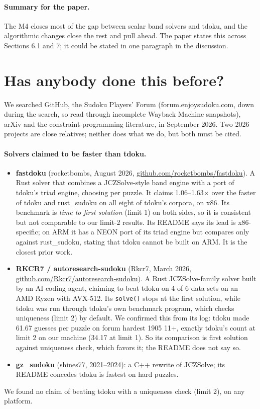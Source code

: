 \documentclass[11pt]{article}
\begin{document}
\paragraph{Summary for the paper.} The M4 closes most of the gap between scalar band solvers and tdoku, and the
algorithmic changes close the rest and pull ahead. The paper states this across Sections 6.1 and 7; it could be
stated in one paragraph in the discussion.


\section*{Has anybody done this before?}

We searched GitHub, the Sudoku Players' Forum (forum.enjoysudoku.com, down during the search, so read through
incomplete Wayback Machine snapshots), arXiv and the constraint-programming literature, in September 2026. Two 2026
projects are close relatives; neither does what we do, but both must be cited.

\paragraph{Solvers claimed to be faster than tdoku.}
\begin{itemize}
\item \textbf{fastdoku} (rocketbombs, August 2026, \url{github.com/rocketbombs/fastdoku}). A Rust solver that combines
  a JCZSolve-style band engine with a port of tdoku's triad engine, choosing per puzzle. It claims 1.06--1.63$\times$
  over the faster of tdoku and rust\_sudoku on all eight of tdoku's corpora, on x86. Its benchmark is \emph{time to
  first solution} (limit 1) on both sides, so it is consistent but not comparable to our limit-2 results. Its README
  says its lead is x86-specific; on ARM it has a NEON port of its triad engine but compares only against rust\_sudoku,
  stating that tdoku cannot be built on ARM. It is the closest prior work.
\item \textbf{RKCR7 / autoresearch-sudoku} (Rkcr7, March 2026,
  \url{github.com/Rkcr7/autoresearch-sudoku}). A Rust
  JCZSolve-family solver built by an AI coding agent, claiming to beat tdoku on 4 of 6 data sets on an AMD Ryzen with
  AVX-512. Its \texttt{solve()} stops at the first solution, while tdoku was run through tdoku's own benchmark program,
  which checks uniqueness (limit 2) by default. We confirmed this from its log: tdoku made 61.67 guesses per puzzle on
  forum hardest 1905 11+, exactly tdoku's count at limit 2 on our machine (34.17 at limit 1). So its comparison is
  first solution against uniqueness check, which favors it; the README does not say so.
\item \textbf{gz\_sudoku} (shines77, 2021--2024): a C++ rewrite of JCZSolve; its README concedes tdoku is fastest on
  hard puzzles.
\end{itemize}
We found no claim of beating tdoku with a uniqueness check (limit 2), on any platform.
\end{document}
